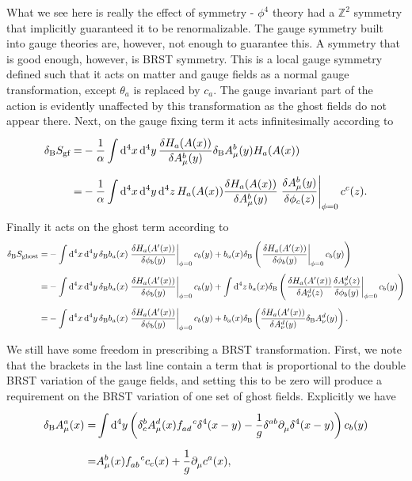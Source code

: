 What we see here is really the effect of symmetry - $\phi^{4}$ theory had a $\mathbb{Z}^{2}$ symmetry that implicitly guaranteed it to be renormalizable. The gauge symmetry built into gauge theories are, however, not enough to guarantee this. A symmetry that is good enough, however, is BRST symmetry. This is a local gauge symmetry defined such that it acts on matter and gauge fields as a normal gauge transformation, except $\theta_{a}$ is replaced by $c_{a}$. The gauge invariant part of the action is evidently unaffected by this transformation as the ghost fields do not appear there. Next, on the gauge fixing term it acts infinitesimally according to
\begin{align*}
	\delta_{\text{B}}S_{\text{gf}} =&  -\frac{1}{\alpha}\inte{}{}\dd[4]{x}\dd[4]{y}\fdv{H_{a}(A(x))}{A_{\mu}^{b}(y)}\delta_{\text{B}}A_{\mu}^{b}(y)H_{a}(A(x)) \\
	=& -\frac{1}{\alpha}\inte{}{}\dd[4]{x}\dd[4]{y}\dd[4]{z}H_{a}(A(x))\fdv{H_{a}(A(x))}{A_{\mu}^{b}(y)}\eval{\fdv{A_{\mu}^{b}(y)}{\phi_{c}(z)}}_{\phi = 0}c^{c}(z).
\end{align*}
Finally it acts on the ghost term according to
\begin{align*}
	\delta_{\text{B}}S_{\text{ghost}} =& -\inte{}{}\dd[4]{x}\dd[4]{y}\delta_{\text{B}}b_{a}(x)\eval{\fdv{H_{a}(A\p(x))}{\phi_{b}(y)}}_{\phi = 0}c_{b}(y) + b_{a}(x)\delta_{\text{B}}\left(\eval{\fdv{H_{a}(A\p(x))}{\phi_{b}(y)}}_{\phi = 0}c_{b}(y)\right) \\
	=& -\inte{}{}\dd[4]{x}\dd[4]{y}\delta_{\text{B}}b_{a}(x)\eval{\fdv{H_{a}(A\p(x))}{\phi_{b}(y)}}_{\phi = 0}c_{b}(y) + \inte{}{}\dd[4]{z}b_{a}(x)\delta_{\text{B}}\left(\eval{\fdv{H_{a}(A\p(x))}{A_{\nu}^{d}(z)}\fdv{A_{\nu}^{d}(z)}{\phi_{b}(y)}}_{\phi = 0}c_{b}(y)\right) \\
	=&  -\inte{}{}\dd[4]{x}\dd[4]{y}\delta_{\text{B}}b_{a}(x)\eval{\fdv{H_{a}(A\p(x))}{\phi_{b}(y)}}_{\phi = 0}c_{b}(y) + b_{a}(x)\delta_{\text{B}}\left(\fdv{H_{a}(A\p(x))}{A_{\nu}^{d}(y)}\delta_{\text{B}}A_{\nu}^{d}(y)\right).
\end{align*}
We still have some freedom in prescribing a BRST transformation. First, we note that the brackets in the last line contain a term that is proportional to the double BRST variation of the gauge fields, and setting this to be zero will produce a requirement on the BRST variation of one set of ghost fields. Explicitly we have
\begin{align*}
	\delta_{\text{B}}A_{\mu}^{a}(x) =& \inte{}{}\dd[4]{y}\left(\kdelta{b}{c}A_{\mu}^{d}(x)\srconst{ad}{c}\delta^{4}(x - y) - \frac{1}{g}\kdelta{ab}{}\del{}{\mu}\delta^{4}(x - y)\right)c_{b}(y) \\
	=& A_{\mu}^{b}(x)\srconst{ab}{c}c_{c}(x) + \frac{1}{g}\del{}{\mu}c^{a}(x),
\end{align*}
